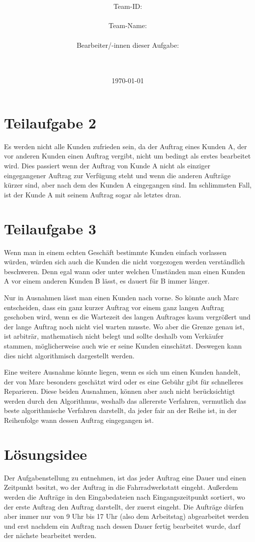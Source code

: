 \documentclass[a4paper,10pt,ngerman]{scrartcl}
\title{\textbf{\Huge\Aufgabe}}
\author{\LARGE Team-ID: \LARGE \TeamId \\\\
\LARGE Team-Name: \LARGE \TeamName \\\\
\LARGE Bearbeiter/-innen dieser Aufgabe: \\
\LARGE \Namen\\\\}
\date{\LARGE\today}
\begin{document}
\maketitle
\tableofcontents

\vspace{0.5cm}

\section{Teilaufgabe 2}\label{sec:begruendung2}
Es werden nicht alle Kunden zufrieden sein, da der Auftrag eines Kunden A, der vor anderen Kunden einen Auftrag vergibt,
nicht um bedingt als erstes bearbeitet wird. Dies passiert wenn der Auftrag von Kunde A
nicht als einziger eingegangener Auftrag zur Verfügung steht und wenn die anderen Aufträge kürzer sind,
aber nach dem des Kunden A eingegangen sind.
Im schlimmsten Fall, ist der Kunde A mit seinem Auftrag sogar als letztes dran.

\section{Teilaufgabe 3}\label{sec:begruendung3 }
Wenn man in einem echten Geschäft bestimmte Kunden einfach vorlassen würden,
würden sich auch die Kunden die nicht vorgezogen werden verständlich beschweren.
Denn egal wann oder unter welchen Umständen man einen Kunden A 
vor einem anderen Kunden B lässt, es dauert für B immer länger.

Nur in Ausnahmen lässt man einen Kunden nach vorne.
So könnte auch Marc entscheiden, dass ein ganz kurzer Auftrag vor einem ganz langen Auftrag geschoben wird,
wenn es die Wartezeit des langen Auftrages kaum vergrößert
und der lange Auftrag noch nicht viel warten musste. Wo aber die Grenze genau ist,
ist arbiträr, mathematisch nicht belegt und sollte deshalb vom Verkäufer stammen,
möglicherweise auch wie er seine Kunden einschätzt.  Deswegen kann dies nicht algorithmisch dargestellt werden.

Eine weitere Ausnahme könnte liegen, wenn es sich um einen Kunden handelt,
der von Marc besonders geschätzt wird oder es eine Gebühr gibt für schnelleres Reparieren.
Diese beiden Ausnahmen, können aber auch nicht berücksichtigt werden durch den Algorithmus,
weshalb das allererste Verfahren, vermutlich das beste algorithmische Verfahren darstellt, da jeder fair an der Reihe ist,
in der Reihenfolge wann dessen Auftrag eingegangen ist.

\section{Lösungsidee}\label{sec:losungsidee}
Der Aufgabenstellung zu entnehmen, ist das jeder Auftrag eine Dauer und einen Zeitpunkt besitzt,
wo der Auftrag in die Fahrradwerkstatt eingeht. Außerdem werden die Aufträge in den Eingabedateien
nach Eingangszeitpunkt sortiert, wo der erste Auftrag den Auftrag darstellt, der zuerst eingeht.
Die Aufträge dürfen aber immer nur von 9 Uhr bis 17 Uhr (also dem Arbeitstag) abgearbeitet werden
und erst nachdem ein Auftrag
nach dessen Dauer fertig bearbeitet wurde, darf der nächste bearbeitet werden.
\end{document}
